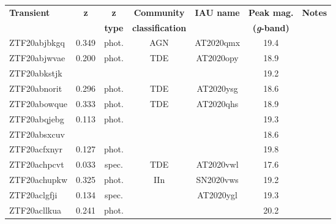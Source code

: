 \begin{table*}
  \begin{tabular}{l  c  c  c   c  c  c}
    \textbf{Transient} & \textbf{z} & \textbf{z}    & \textbf{Community}      & \textbf{IAU name} & \textbf{Peak mag.}         & \textbf{Notes} \\
                       &            & \textbf{type} & \textbf{classification} &                   & \textbf{(\textit{g}-band)} &                \\ \hline
    ZTF20abjbkgq       & 0.349      & phot.         & AGN                     & AT2020qmx         & 19.4                       &                \\
    ZTF20abjwvae       & 0.200      & phot.         & TDE                     & AT2020opy         & 18.9                       &                \\
    ZTF20abkstjk       & ~          & ~             & ~                       & ~                 & 19.2                       &                \\
    ZTF20abnorit       & 0.296      & phot.         & TDE                     & AT2020ysg         & 18.6                       &                \\
    ZTF20abowque       & 0.333      & phot.         & TDE                     & AT2020qhs         & 18.9                       &                \\
    ZTF20abqjebg       & 0.113      & phot.         & ~                       & ~                 & 19.3                       &                \\
    ZTF20absxcuv       & ~          & ~             & ~                       & ~                 & 18.6                       &                \\
    ZTF20acfxnyr       & 0.127      & phot.         & ~                       & ~                 & 19.8                       &                \\
    ZTF20achpcvt       & 0.033      & spec.         & TDE                     & AT2020vwl         & 17.6                       &                \\
    ZTF20achupkw       & 0.325      & phot.         & IIn                     & SN2020vws         & 19.2                       &                \\
    ZTF20aclgfji       & 0.134      & spec.         & ~                       & AT2020ygl         & 19.3                       &                \\
    ZTF20acllkua       & 0.241      & phot.         & ~                       & ~                 & 20.2                       &                \\

\end{tabular}
\end{table*}
